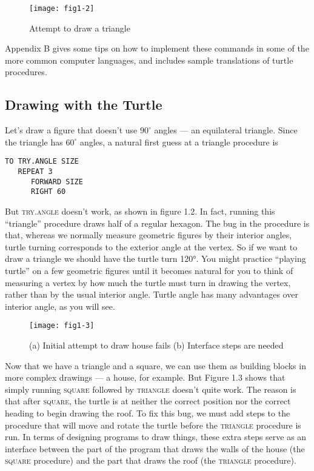 \documentclass{book}
\begin{document}
\begin{figure}
\begin{center}
\texttt{[image: fig1-2]}
\caption{Attempt to draw a triangle}
\end{center}
\end{figure}

Appendix B gives some tips on how to implement these commands in
some of the more common computer languages, and includes sample
translations of turtle procedures.

\subsection{Drawing with the Turtle}
Let's draw a figure that doesn't use $90^{\circ}$ angles --- an equilateral triangle. Since the triangle has $60^{\circ}$ angles, a natural first guess at a triangle procedure is

\begin{verbatim}
TO TRY.ANGLE SIZE
   REPEAT 3
      FORWARD SIZE
      RIGHT 60
\end{verbatim}
But \textsc{try.angle} doesn't work, as shown in figure 1.2. In fact, running this ``triangle'' procedure draws half of a regular hexagon. The bug in the procedure is that, whereas we normally measure geometric figures by their interior angles, turtle turning corresponds to the exterior angle at the vertex. So if we want to draw a triangle we should have the turtle turn 120°. You might practice ``playing turtle'' on a few geometric figures until it becomes natural for you to think of measuring a vertex by how much the turtle must turn in drawing the vertex, rather than by the usual interior angle. Turtle angle has many advantages over interior angle, as you will see.

\begin{figure}
\begin{center}
\texttt{[image: fig1-3]}
\caption{(a) Initial attempt to draw house fails (b) Interface steps are needed}
\end{center}
\end{figure}


Now that we have a triangle and a square, we can use them as building blocks in more complex drawings --- a house, for example. But Figure 1.3 shows that simply running \textsc{square} followed by \textsc{triangle} doesn't quite work. The reason is that after \textsc{square}, the turtle is at neither the correct position nor the correct heading to begin drawing the roof. To fix this bug, we must add steps to the procedure that will move and rotate the turtle before the \textsc{triangle} procedure is run. In terms of designing programs to draw things, these extra steps serve as an interface between the part of the program that draws the walls of the house (the \textsc{square} procedure) and the part that draws the roof (the \textsc{triangle} procedure).
\end{document}
